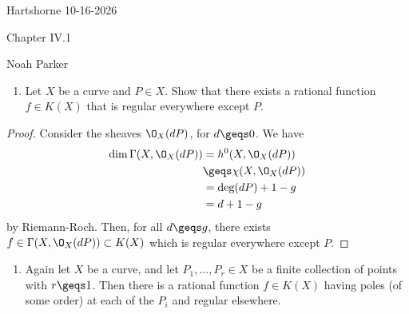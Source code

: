 \documentclass[12pt]{amsart}
\begin{document}
{Hartshorne} \hfill {10-16-2026}

\bigskip\bigskip

\begin{center}

{\sc Chapter IV.1}

\end{center}

\begin{center}

  {Noah Parker} 
    
\end{center}

\bigskip\bigskip

\begin{enumerate}
	\item[1.] {
      Let $X$ be a curve and $P\in X$.
      Show that there exists a rational function $f\in K(X)$ that is regular everywhere except $P$.
    }
\end{enumerate} 

\begin{proof}
  Consider the sheaves $\O_X(dP)$, for $d\geqs 0$.
  We have 
  \begin{align*}
    \dim\Gamma(X,\O_X(dP))
    &=h^0(X,\O_X(dP)) \\
    &\geqs \chi(X,\O_X(dP)) \\
    &= \deg (dP) +1-g \\
    &= d + 1-g
  \end{align*}
  by Riemann-Roch.
  Then, for all $d\geqs g$, there exists $f\in \Gamma(X,\O_X(dP))\subset K(X)$ which is regular everywhere except $P$.
\end{proof}

\begin{enumerate}
	\item[2.] {
      Again let $X$ be a curve, and let $P_1,\ldots, P_r\in X$ be a finite collection of points with $r\geqs 1$.
      Then there is a rational function $f\in K(X)$ having poles (of some order) at each of the $P_i$ and regular elsewhere.
    }
\end{enumerate}
\end{document}
